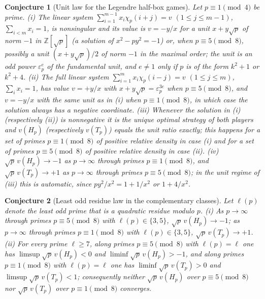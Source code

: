 \documentclass[11pt]{article}
\newtheorem{conjecture}{Conjecture}
\theoremstyle{definition}
\newcommand{\Z}{\mathbb Z}
\newcommand{\eps}{\varepsilon}
\providecommand{\Z}{\mathbb Z}
\begin{document}
\begin{conjecture}[Unit law for the Legendre half-box games]\label{at8}
Let $p\equiv1\pmod4$ be prime.
{\rm(i)} The linear system $\sum_{i=1}^{m-1}x_i\chi_p(i+j)=v$
$(1\le j\le m-1)$, $\sum_{i<m}x_i=1$, is nonsingular and its value is
$v=-y/x$ for a unit $x+y\sqrt p$ of norm $-1$ in $\Z[\sqrt p]$ (a solution of
$x^2-py^2=-1$) or, when $p\equiv5\pmod8$, possibly a unit
$(x+y\sqrt p)/2$ of norm $-1$ in the maximal order; the unit is an odd power
$\eps_p^{e}$ of the fundamental unit, and $e\ne1$ only if $p$ is of the
form $k^2+1$ or $k^2+4$.
{\rm(ii)} The full linear system $\sum_{i=1}^{m}x_i\chi_p(i-j)=v$
$(1\le j\le m)$, $\sum_ix_i=1$, has value $v=+y/x$ with $x+y\sqrt p=\eps_p^{3e}$
when $p\equiv5\pmod8$, and $v=-y/x$ with the same unit as in {\rm(i)}
when $p\equiv1\pmod8$, in which case the solution always has a negative
coordinate.
{\rm(iii)} Whenever the solution in {\rm(i)} (respectively {\rm(ii)}) is
nonnegative it is the unique optimal strategy of both players and
$v(H_p)$ (respectively $v(T_p)$) equals the unit ratio exactly; this
happens for a set of primes $p\equiv1\pmod8$ of positive relative density in
case {\rm(i)} and for a set of primes $p\equiv5\pmod8$ of positive relative
density in case {\rm(ii)}.
{\rm(iv)} $\sqrt p\,v(H_p)\to-1$ as $p\to\infty$ through primes
$p\equiv1\pmod8$, and $\sqrt p\,v(T_p)\to+1$ as $p\to\infty$ through
primes $p\equiv5\pmod8$; in the unit regime of {\rm(iii)} this is
automatic, since $py^2/x^2=1+1/x^2$ or $1+4/x^2$.
\end{conjecture}


\begin{conjecture}[Least odd residue law in the complementary classes]\label{at9}
Let $\ell(p)$ denote the least odd prime that is a quadratic residue modulo
$p$.
{\rm(i)} As $p\to\infty$ through primes $p\equiv5\pmod8$ with
$\ell(p)\in\{3,5\}$, $\sqrt p\,v(H_p)\to-1$; as $p\to\infty$ through primes
$p\equiv1\pmod8$ with $\ell(p)\in\{3,5\}$, $\sqrt p\,v(T_p)\to+1$.
{\rm(ii)} For every prime $\ell\ge7$, along primes $p\equiv5\pmod8$ with
$\ell(p)=\ell$ one has $\limsup\sqrt p\,v(H_p)<0$ and
$\liminf\sqrt p\,v(H_p)>-1$, and along primes $p\equiv1\pmod8$ with
$\ell(p)=\ell$ one has $\liminf\sqrt p\,v(T_p)>0$ and
$\limsup\sqrt p\,v(T_p)<1$; consequently neither $\sqrt p\,v(H_p)$ over
$p\equiv5\pmod8$ nor $\sqrt p\,v(T_p)$ over $p\equiv1\pmod8$ converges.
\end{conjecture}
\end{document}
